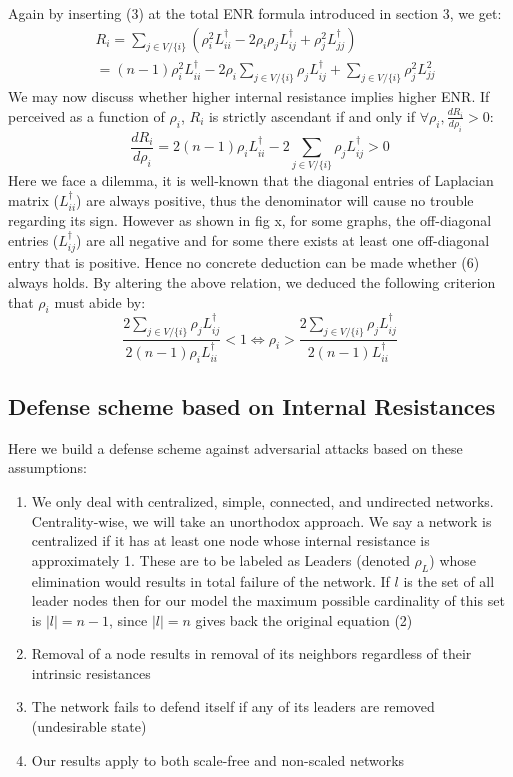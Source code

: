 \documentclass{article}
\begin{document}
	Again by inserting (3) at the total ENR formula introduced in section 3, we get:
	\begin{equation}
	\begin{aligned}
		&R_i = \sum_{j\in V/ \{i\}} \left( \rho_i^{2} L_{ii}^{\dag} - 2\rho_i \rho_j L_{ij}^{\dag} + \rho_j^{2} L_{jj}^{\dag} \right) \\
		&=(n-1)\rho_i^{2}L_{ii}^{\dag}-2\rho_i \sum_{j\in V/ \{i\}} \rho_j L_{ij}^{\dag} + \sum_{j\in V/ \{i\}} \rho_j^{2} L_{jj}^{2}
	\end{aligned}
	\end{equation}
	We may now discuss whether higher internal resistance implies higher ENR. If perceived as a function of $\rho_i$, $R_i$ is strictly ascendant if and only if $\forall \rho_i, \frac{dR_i}{d\rho_i} > 0$:
	\begin{equation}
		\frac{dR_i}{d \rho_i} = 2(n-1)\rho_i L_{ii}^{\dag} - 2\sum_{j\in V / \{i\}} \rho_j L_{ij}^{\dag} > 0
	\end{equation}
	Here we face a dilemma, it is well-known that the diagonal entries of Laplacian matrix ($L_{ii}^{\dag}$) are always positive, thus the denominator will cause no trouble regarding its sign. However as shown in fig x, for some graphs, the off-diagonal entries ($L_{ij}^{\dag}$) are all negative and for some there exists at least one off-diagonal entry that is positive. Hence no concrete deduction can be made whether (6) always holds. By altering the above relation, we deduced the following criterion that $\rho_i$ must abide by:
	\begin{equation}
		\frac{2\sum_{j\in V / \{i\}} \rho_j L_{ij}^{\dag}} {2(n-1)\rho_i L_{ii}^{\dag}} < 1 \Longleftrightarrow \rho_i > \frac{2\sum_{j\in V / \{i\}} \rho_j L_{ij}^{\dag}} {2(n-1) L_{ii}^{\dag}}
	\end{equation}
	\subsection{Defense scheme based on Internal Resistances}
	Here we build a defense scheme against adversarial attacks based on these assumptions:
	
	\begin{enumerate}
		\item {We only deal with centralized, simple, connected, and undirected networks.}
		Centrality-wise, we will take an unorthodox approach. We say a network is centralized if it has at least one node whose internal resistance is approximately 1. These are to be labeled as Leaders (denoted $\rho_L$) whose elimination would results in total failure of the network. If $l$ is the set of all leader nodes then for our model the maximum possible cardinality of this set is $|l| = n-1$, since $|l|=n$ gives back the original equation (2)
		\item {Removal of a node results in removal of its neighbors regardless of their intrinsic resistances}
		\item {The network fails to defend itself if any of its leaders are removed (undesirable state)}
		\item {Our results apply to both scale-free and non-scaled networks}
	\end{enumerate}
	
\end{document}
